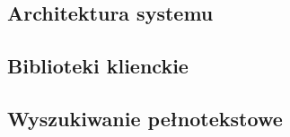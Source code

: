 \subsection{Architektura systemu}

\subsection{Biblioteki klienckie}

\subsection{Wyszukiwanie pełnotekstowe}
